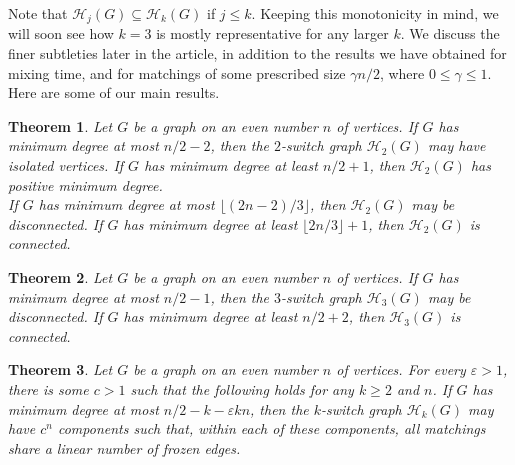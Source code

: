\documentclass[11pt,a4paper]{article}
\newtheorem{theorem}{Theorem}[section]
\theoremstyle{definition}
\newcommand{\eps}{\varepsilon}
\begin{document}
Note that $\mathcal H_j(G) \subseteq \mathcal H_k(G)$ if $j\le k$. Keeping this monotonicity in mind, we will soon see how $k=3$ is mostly representative for any larger
$k$. We discuss the finer subtleties later in the article, in addition to the
results we have obtained for mixing time, and for matchings of some prescribed
size $\gamma n/2$, where $0 \le \gamma \le 1$. Here are some of our main results.

\begin{theorem}\label{thm:k=2} Let $G$ be a graph on an
  even number $n$ of vertices.  If $G$ has minimum degree at most $n/2-2$, then
  the $2$-switch graph $\mathcal H_2(G)$ may have isolated vertices. If $G$ has
  minimum degree at least $n/2+1$, then $\mathcal H_2(G)$ has positive minimum
  degree.\\
  If $G$ has minimum degree at most $\lfloor (2n-2)/3\rfloor$, then $\mathcal H_2(G)$ may be disconnected. If $G$ has minimum degree at least $\lfloor 2n/3\rfloor+1$, then $\mathcal H_2(G)$ is connected.
\end{theorem}

\begin{theorem}\label{thm:k=3} Let $G$ be a graph on an even number
$n$ of vertices. If $G$ has minimum degree at most $n/2-1$, then the $3$-switch graph $\mathcal H_3(G)$ may be disconnected. If $G$ has minimum degree at least $n/2+2$, then $\mathcal H_3(G)$ is connected.
\end{theorem}

\begin{theorem}\label{thm:k>=2} Let $G$ be a graph on an even number
  $n$ of vertices. For every $\eps >1$, there is some $c >1$ such that the
  following holds for any $k \ge 2$ and $n$. If $G$ has minimum degree at most
  $n/2- k - \eps kn$, then the $k$-switch graph $\mathcal H_k(G)$ may have
  $c^n$ components such that, within each of these components, all matchings share a
  linear number of {\em frozen} edges.
\end{theorem}

 
\end{document}
